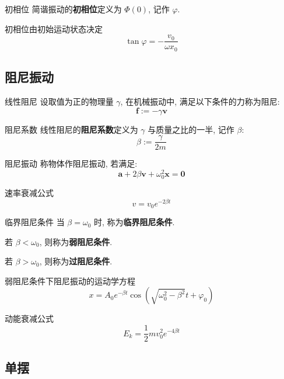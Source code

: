 \documentclass[UTF8]{ctexart}
\begin{document}
            \begin{dfn}
                {初相位}
                简谐振动的\textbf{初相位}定义为 \(\Phi(0)\), 记作 \(\varphi\). 
            \end{dfn}
            
            \begin{ppt}
                {初相位由初始运动状态决定}
                \[\tan\varphi=-\frac{v_0}{\omega x_0}\]
            \end{ppt}

        \subsection{阻尼振动}
            
            \begin{dfn}
                {线性阻尼}
                设取值为正的物理量 \(\gamma\), 在机械振动中, 满足以下条件的力称为阻尼: 
                \[\bm{f}:=-\gamma\bm{v}\]
            \end{dfn}
            
            \begin{dfn}
                {阻尼系数}
                线性阻尼的\textbf{阻尼系数}定义为 \(\gamma\) 与质量之比的一半, 记作 \(\beta\): 
                \[\beta:=\frac{\gamma}{2m}\]
            \end{dfn}
            
            \begin{thm}
                {阻尼振动}
                称物体作阻尼振动, 若满足: 
                \[\bm{a}+2\beta\bm{v}+\omega_0^2\bm{x}=\bm{0}\]
            \end{thm}
            
            \begin{thm}
                {速率衰减公式}
                \[v=v_0 e^{-2\beta t}\]
            \end{thm}
            
            \begin{dfn}
                {临界阻尼条件}
                当 \(\beta=\omega_0\) 时, 称为\textbf{临界阻尼条件}. 

                若 \(\beta<\omega_0\), 则称为\textbf{弱阻尼条件}. 

                若 \(\beta>\omega_0\), 则称为\textbf{过阻尼条件}. 
            \end{dfn}
            
            \begin{thm}
                {弱阻尼条件下阻尼振动的运动学方程}
                \[x=A_0e^{-\beta t}\cos(\sqrt{\omega_0^2-\beta^2}t+\varphi_0)\]
            \end{thm}
            
            \begin{thm}
                {动能衰减公式}
                \[E_k=\frac{1}{2}mv_0^2 e^{-4\beta t}\]
            \end{thm}

        \subsection{单摆}
    
\end{document}
